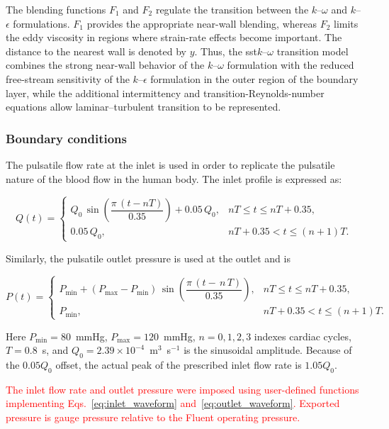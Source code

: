 \documentclass[12pt,a4paper]{article}
\newcommand{\cfdrevision}[1]{\textcolor{red}{#1}}
\newcommand{\SST}{\ac{sst}\xspace}
\theoremstyle{definition}
\numberwithin{equation}{section}
\newcommand{\revision}[1]{\textcolor{red}{#1}}
\begin{document}
The blending functions \(F_1\) and \(F_2\) regulate the transition between the \(k\)--\(\omega\) and \(k\)--\(\epsilon\) formulations. \(F_1\) provides the appropriate near-wall blending, whereas \(F_2\) limits the eddy viscosity in regions where strain-rate effects become important. The distance to the nearest wall is denoted by \(y\). Thus, the \SST \(k\)--\(\omega\) transition model combines the strong near-wall behavior of the \(k\)--\(\omega\) formulation with the reduced free-stream sensitivity of the \(k\)--\(\epsilon\) formulation in the outer region of the boundary layer, while the additional intermittency and transition-Reynolds-number equations allow laminar--turbulent transition to be represented.

\subsubsection{Boundary conditions}
The pulsatile flow rate at the inlet is used in order to replicate the pulsatile nature of the blood flow in the human body. The inlet profile is expressed as:

  \begin{equation}
Q(t)=
\begin{cases}
Q_0\,\sin\!\left(\dfrac{\pi\,(t-nT)}{0.35}\right)+0.05\,Q_0,
& nT \le t \le nT+0.35, \\[6pt]
0.05\,Q_0,
& nT+0.35 < t \le (n+1)T.
\end{cases}
\label{eq:inlet_waveform}
\end{equation}

Similarly, the pulsatile outlet pressure is used at the outlet and is

  \begin{equation}
P(t) =
\begin{cases}
P_\mathrm{min} + \left(P_\mathrm{max} - P_\mathrm{min}\right) \, \sin\left(\dfrac{\pi \, (t - \, n \, T)}{0.35}\right), & nT \le t \le nT+0.35, \\
P_\mathrm{min}, & nT+0.35 < t \le (n+1)T.
\end{cases}
\label{eq:outlet_waveform}
\end{equation}

Here $P_{\mathrm{min}}=80$~mmHg, $P_{\mathrm{max}}=120$~mmHg, $n=0,1,2,3$ indexes cardiac cycles, $T=0.8$~s, and $Q_0=2.39\times10^{-4}$~m$^3$~s$^{-1}$ is the sinusoidal amplitude. Because of the $0.05Q_0$ offset, the actual peak of the prescribed inlet flow rate is $1.05Q_0$.

 \revision{\cfdrevision{The inlet flow rate and outlet pressure were imposed using user-defined functions implementing Eqs.~\eqref{eq:inlet_waveform} and~\eqref{eq:outlet_waveform}. Exported pressure is gauge pressure relative to the Fluent operating pressure.}
}
\end{document}
